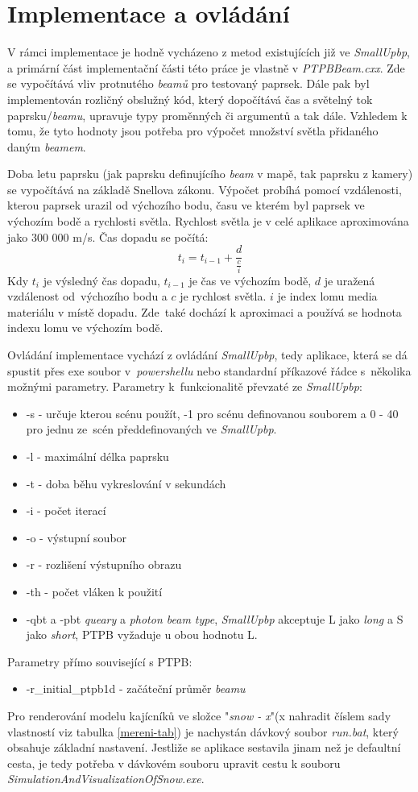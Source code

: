 \section{Implementace a ovládání}
V rámci implementace je hodně vycházeno z metod existujících již ve \textit{SmallUpbp}, a primární část implementační části této práce je vlastně  v \textit{PTPBBeam.cxx}. Zde se vypočítává vliv protnutého \textit{beamů} pro testovaný paprsek. Dále pak byl implementován rozličný obslužný kód, který dopočítává čas a světelný tok paprsku/\textit{beamu}, upravuje typy proměnných či argumentů a tak dále. Vzhledem k tomu, že tyto hodnoty jsou potřeba pro výpočet množství světla přidaného daným \textit{beamem}. 

Doba letu paprsku (jak paprsku definujícího \textit{beam} v mapě, tak paprsku z kamery) se vypočítává na základě Snellova zákonu. Výpočet probíhá 
pomocí vzdálenosti, kterou paprsek urazil od výchozího bodu, času ve kterém byl paprsek ve výchozím bodě a rychlosti světla. Rychlost světla je v celé aplikace aproximována jako 300 000 m/s. Čas dopadu se počítá: $$t_i = t_{i-1} + \frac{d}{\frac{c}{i}}$$
Kdy $t_i$ je výsledný čas dopadu, $t_{i-1}$ je čas ve výchozím bodě, $d$ je uražená vzdálenost od~výchozího bodu a $c$ je rychlost světla. $i$ je index lomu media materiálu v místě dopadu. Zde~také dochází k aproximaci a používá se hodnota indexu lomu ve výchozím bodě.

Ovládání implementace vychází z ovládání \textit{SmallUpbp}, tedy aplikace, která se dá spustit přes exe soubor v~\textit{powershellu} nebo standardní příkazové řádce s~několika možnými parametry.
Parametry k~funkcionalitě převzaté ze \textit{SmallUpbp}:
\begin{itemize}
    \item -s - určuje kterou scénu použít, -1 pro scénu definovanou souborem a 0 - 40 pro jednu ze~scén předdefinovaných ve \textit{SmallUpbp}.
    \item -l - maximální délka paprsku 
    \item -t - doba běhu vykreslování v sekundách
    \item -i - počet iterací
    \item -o - výstupní soubor
    \item -r - rozlišení výstupního obrazu
    \item -th - počet vláken k použití
    \item -qbt a -pbt \textit{queary} a \textit{photon beam type}, \textit{SmallUpbp} akceptuje L jako \textit{long} a S jako \textit{short}, PTPB vyžaduje u obou hodnotu L. 
\end{itemize}
Parametry přímo související s PTPB:
\begin{itemize}
    \item -r\_initial\_ptpb1d - začáteční průměr \textit{beamu}
\end{itemize}
Pro renderování modelu kajícníků ve složce "\textit{snow - x}"(x nahradit číslem sady vlastností viz tabulka \ref{mereni-tab}) je nachystán dávkový soubor \textit{run.bat}, který obsahuje základní nastavení. Jestliže se aplikace sestavila jinam než je defaultní cesta, je tedy potřeba v dávkovém souboru upravit cestu k souboru \textit{SimulationAndVisualizationOfSnow.exe}. 


